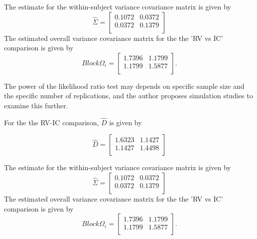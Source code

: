 The estimate for the within-subject variance covariance matrix is
given by
\begin{equation}
\hat{\Sigma}= \left[ \begin{array}{cc}
0.1072 & 0.0372  \\
0.0372 & 0.1379  \\
\end{array}\right]
\end{equation}
The estimated overall variance covariance matrix for the the 'RV
vs IC' comparison is given by
\begin{equation}
Block \Omega_{i}= \left[ \begin{array}{cc}
1.7396 & 1.1799  \\
1.1799 & 1.5877  \\
\end{array} \right].
\end{equation}

The power of the
likelihood ratio test may depends on specific sample size and the
specific number of  replications, and the author proposes
simulation studies to examine this further.

\newpage
For the the RV-IC comparison, $\hat{D}$ is given by


\begin{equation}
\hat{D}= \left[ \begin{array}{cc}
1.6323 & 1.1427  \\
1.1427 & 1.4498 \\
\end{array} \right]
\end{equation}

The estimate for the within-subject variance covariance matrix is
given by
\begin{equation}
\hat{\Sigma}= \left[ \begin{array}{cc}
0.1072 & 0.0372  \\
0.0372 & 0.1379  \\
\end{array}\right]
\end{equation}
The estimated overall variance covariance matrix for the the 'RV
vs IC' comparison is given by
\begin{equation}
Block \Omega_{i}= \left[ \begin{array}{cc}
1.7396 & 1.1799  \\
1.1799 & 1.5877  \\
\end{array} \right].
\end{equation}

